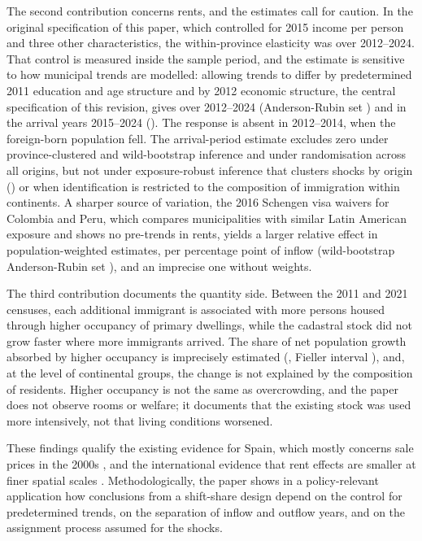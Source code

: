 \documentclass[11pt,a4paper]{article}
\begin{document}
The second contribution concerns rents, and the estimates call for caution. In the original specification of this paper, which controlled for 2015 income per person and three other characteristics, the within-province elasticity was \origFullB{} over 2012--2024. That control is measured inside the sample period, and the estimate is sensitive to how municipal trends are modelled: allowing trends to differ by predetermined 2011 education and age structure and by 2012 economic structure, the central specification of this revision, gives \cenFullB{} over 2012--2024 (Anderson-Rubin set \cenFullAR) and \cenArrB{} in the arrival years 2015--2024 (\cenArrAR). The response is absent in 2012--2014, when the foreign-born population fell. The arrival-period estimate excludes zero under province-clustered and wild-bootstrap inference and under randomisation across all origins, but not under exposure-robust inference that clusters shocks by origin (\cenArrAKM) or when identification is restricted to the composition of immigration within continents. A sharper source of variation, the 2016 Schengen visa waivers for Colombia and Peru, which compares municipalities with similar Latin American exposure and shows no pre-trends in rents, yields a larger relative effect in population-weighted estimates, \epBW{} per percentage point of inflow (wild-bootstrap Anderson-Rubin set \epWCRW), and an imprecise one without weights.

The third contribution documents the quantity side. Between the 2011 and 2021 censuses, each additional immigrant is associated with \crowdC{} more persons housed through higher occupancy of primary dwellings, while the cadastral stock did not grow faster where more immigrants arrived. The share of net population growth absorbed by higher occupancy is imprecisely estimated (\shareC, Fieller interval \shareCfi), and, at the level of continental groups, the change is not explained by the composition of residents. Higher occupancy is not the same as overcrowding, and the paper does not observe rooms or welfare; it documents that the existing stock was used more intensively, not that living conditions worsened.

These findings qualify the existing evidence for Spain, which mostly concerns sale prices in the 2000s \citep{gonzalez2013,sanchis2023}, and the international evidence that rent effects are smaller at finer spatial scales \citep{saiz2011,accetturo2014}. Methodologically, the paper shows in a policy-relevant application how conclusions from a shift-share design depend on the control for predetermined trends, on the separation of inflow and outflow years, and on the assignment process assumed for the shocks.
\end{document}
